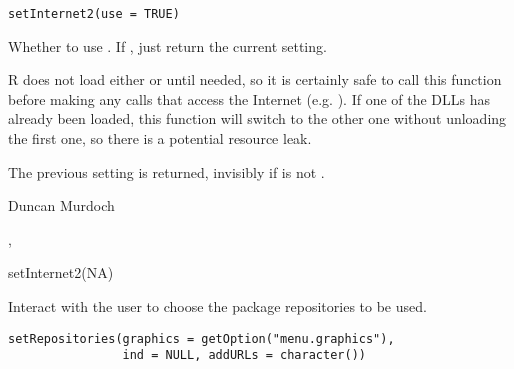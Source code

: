 %
\begin{Usage}
\begin{verbatim}
setInternet2(use = TRUE)
\end{verbatim}
\end{Usage}
%
\begin{Arguments}
\begin{ldescription}
\item[\code{use}] Whether to use .  If , just
return the current setting.

\end{ldescription}
\end{Arguments}
%
\begin{Details}\relax
R does not load either  or 
until needed, so it is certainly safe to call this function before
making any calls that access the Internet
(e.g. ).  If one of the DLLs has already
been loaded, this function will switch to the other one without
unloading the first one, so there is a potential resource leak.
\end{Details}
%
\begin{Value}
The previous setting is returned, invisibly if  is not .
\end{Value}
%
\begin{Author}\relax
Duncan Murdoch
\end{Author}
%
\begin{SeeAlso}\relax
{}, 
\end{SeeAlso}
%
\begin{Examples}
\begin{ExampleCode}
setInternet2(NA)
\end{ExampleCode}
\end{Examples}
%
\begin{Description}\relax
Interact with the user to choose the package repositories to be used.
\end{Description}
%
\begin{Usage}
\begin{verbatim}
setRepositories(graphics = getOption("menu.graphics"),
                ind = NULL, addURLs = character())
\end{verbatim}
\end{Usage}
%
